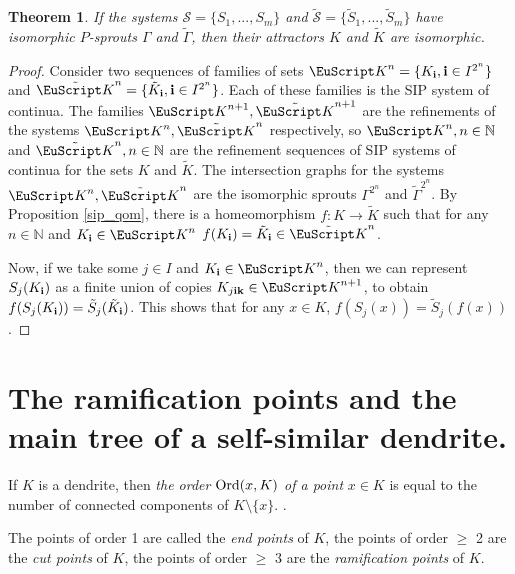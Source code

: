 \documentclass[11pt,reqno]{amsart}
\newtheorem{theorem}{Theorem}[section]
\newcommand{\eS}{{\mathcal S}}
\begin{document}
\begin{theorem}\label{isom}
   If the systems ${\eS}=\{S_1,...,S_m\}$ and $\tilde {\eS}=\{\tilde S_1,...,\tilde S_m\}$ have isomorphic $P$-sprouts $\Gamma$ and $\tilde \Gamma$, then their attractors $K$ and $ \tilde K$ are isomorphic.
\end{theorem}

\begin{proof}

Consider two sequences of families of sets ${\EuScript K}^n=\{K_{\bf {i}}, {\bf {i}}\in I^{2^n}\}$ and $\tilde{\EuScript K}^n=\{\tilde K_{\bf {i}}, {\bf {i}}\in I^{2^n}\}$. Each of these families is the SIP system of continua. The families
 ${\EuScript K}^{n+1}, \tilde{\EuScript K}^{n+1}$ are the refinements of the systems  $ {\EuScript K}^n, \tilde{\EuScript K}^n$ respectively, so ${\EuScript K}^n, n\in\mathbb{N}$ and $\tilde{\EuScript K}^n, n\in\mathbb{N}$ are the refinement sequences of SIP systems of continua for the sets $K$ and $\tilde K$. The intersection graphs for the  systems  $ {\EuScript K}^n, \tilde{\EuScript K}^n$ are the isomorphic sprouts $\Gamma^{2^n}$ and $\tilde \Gamma^{2^n}$. By Proposition \ref{sip_qom}, there is a homeomorphism $f : K \to \tilde{K}$ such that for any   $n \in \mathbb{N} $ and $K_{\bf { i}}\in {\EuScript K}^n$ $f(K_{\bf {i}}) = \tilde{K}_{\bf {i}}\in \tilde{\EuScript K}^n$. 
 
 Now, if we take some $j\in I$ and $K_{\bf {i}}\in {\EuScript K}^n$, then we can represent $S_j(K_{\bf {i}})$ as a finite union of copies $K_{j\bf {i}\bf {k}}\in  {\EuScript K}^{n+1}$, to obtain $f(S_j(K_{\bf {i}}))= \tilde S_j(\tilde K_{\bf {i}})$. This shows that for any $x\in K$, $f(S_j(x))=\tilde S_j(f(x))$.
\end{proof}

\section{The ramification points and the main tree of a self-similar dendrite.}
 
If $K$ is a dendrite, then {\em the order ${\mathop{\rm Ord} \nolimits}(x,K)$ of a point} $x\in K$ is equal to the number of connected components of $K\setminus\{x\}$.  \cite[Ch.6,Th. 6]{Kur}. 
     
The points of order 1 are called the {\em end points} of $K$, the points of  order $\ge$ 2 are  the {\em cut points} of $K$,  the points of order $\ge$ 3 are the {\em ramification points} of $K$.
\end{document}
